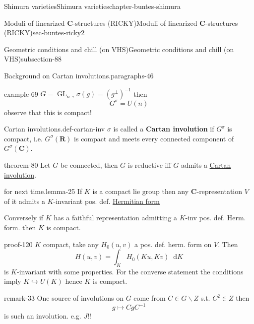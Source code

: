 \documentclass[oneside,10pt,]{book}
\newcommand{\terminology}[1]{\textbf{#1}}
\numberwithin{equation}{section}
\newcommand{\diff}{\mathop{}\!\mathrm{d}}
\newcommand{\inv}{^{-1}}
\newcommand{\RR}{\mathbf{R}}
\newcommand{\CC}{\mathbf{C}}
\DeclareMathOperator{\GL}{GL}
\begin{document}
\begin{chapterptx}{Shimura varieties}{}{Shimura varieties}{}{}{chapter-buntes-shimura}
\begin{sectionptx}{Moduli of linearized \(\CC\)-structures (RICKY)}{}{Moduli of linearized \(\CC\)-structures (RICKY)}{}{}{sec-buntes-ricky2}
\begin{subsectionptx}{Geometric conditions and chill (on VHS)}{}{Geometric conditions and chill (on VHS)}{}{}{subsection-88}
\begin{paragraphs}{Background on Cartan involutions.}{paragraphs-46}
\begin{example}{}{example-69}
\hypertarget{p-1202}{}%
\(G = \GL_n\), \(\sigma(g) = (g^\perp)\inv\) then%
\begin{equation*}
G^\sigma = U(n)
\end{equation*}
observe that this is compact!%
\end{example}
\begin{definition}{Cartan involutions.}{def-cartan-inv}%
\hypertarget{p-1203}{}%
\(\sigma\) is called a \terminology{Cartan involution} if \(G^\sigma\) is compact, i.e. \(G^\sigma(\RR)\) is compact and meets every connected component of \(G^\sigma(\CC)\).%
\end{definition}
\begin{theorem}{}{}{theorem-80}%
\hypertarget{p-1204}{}%
Let \(G\) be connected, then \(G\) is reductive iff \(G\) admits a \hyperref[def-cartan-inv]{Cartan involution}.%
\end{theorem}
\begin{lemma}{for next time.}{}{lemma-25}%
\hypertarget{p-1205}{}%
If \(K\) is a compact lie group then any \(\CC\)-representation \(V\) of it admits a \(K\)-invariant pos. def. \hyperref[def-herm-form]{Hermitian form}%
\par
\hypertarget{p-1206}{}%
Conversely if \(K\) has a faithful representation admitting a \(K\)-inv pos. def. Herm. form. then \(K\) is compact.%
\end{lemma}
\begin{proofptx}{}{proof-120}
\hypertarget{p-1207}{}%
\(K\) compact, take any \(H_0(u,v)\) a pos. def. herm. form on \(V\). Then%
\begin{equation*}
H(u,v) = \int_K H_0(Ku, Kv) \diff K
\end{equation*}
is \(K\)-invariant with some properties. For the converse statement the conditions imply \(K \hookrightarrow U(K)\) hence \(K\) is compact.%
\end{proofptx}
\begin{remark}{}{remark-33}%
\hypertarget{p-1208}{}%
One source of involutions on \(G\) come from \(C\in G\smallsetminus Z\) s.t. \(C^2 \in Z\) then%
\begin{equation*}
g   \mapsto C g C\inv
\end{equation*}
is such an involution. e.g. \(J\)!!%
\end{remark}
\end{paragraphs}%
\end{subsectionptx}
\end{sectionptx}
%
%
\typeout{************************************************}

\end{chapterptx}
\end{document}
